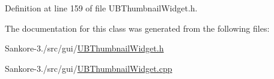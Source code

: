 Definition at line 159 of file U\-B\-Thumbnail\-Widget.\-h.



The documentation for this class was generated from the following files\-:\begin{DoxyCompactItemize}
\item 
Sankore-\/3./src/gui/\hyperlink{_u_b_thumbnail_widget_8h}{U\-B\-Thumbnail\-Widget.\-h}\item 
Sankore-\/3./src/gui/\hyperlink{_u_b_thumbnail_widget_8cpp}{U\-B\-Thumbnail\-Widget.\-cpp}\end{DoxyCompactItemize}
